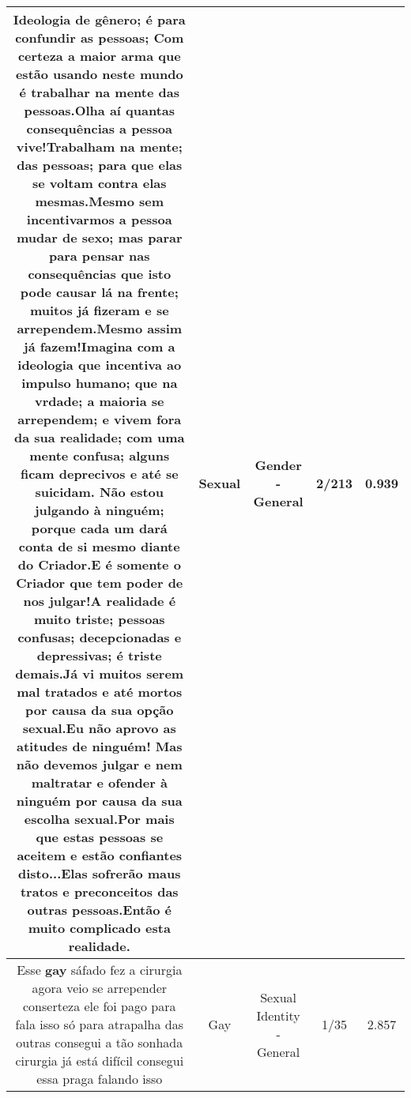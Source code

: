 \documentclass[11pt]{article}
\newlength\mylength
\begin{document}
\begin{center}
\begin{longtable}{|C{.65\mylength}|C{.30\mylength}|C{.12\mylength}|C{.12\mylength}|C{.12\mylength}|}
  \small Ideologia de gênero; é para confundir as pessoas; Com certeza a maior arma que estão usando neste mundo é trabalhar na mente das pessoas.Olha aí quantas consequências a pessoa vive!Trabalham na mente; das pessoas; para que elas se voltam contra elas mesmas.Mesmo sem incentivarmos a pessoa mudar de sexo; mas parar para pensar nas consequências que isto pode causar lá na frente; muitos já fizeram e se arrependem.Mesmo assim já fazem!Imagina com a ideologia que incentiva ao impulso humano; que na vrdade; a maioria se arrependem; e vivem fora da sua realidade; com uma mente confusa; alguns ficam deprecivos e até se suicidam. Não estou julgando à ninguém; porque cada um dará conta de si mesmo diante do Criador.E é somente o Criador que tem poder de nos julgar!A realidade é muito triste; pessoas confusas; decepcionadas e depressivas; é triste demais.Já vi muitos serem mal tratados e até mortos por causa da sua opção \textbf{sexual}.Eu não aprovo as atitudes de ninguém! Mas não devemos julgar e nem maltratar e ofender à ninguém por causa da sua escolha \textbf{sexual}.Por mais que estas pessoas se aceitem e estão confiantes disto...Elas sofrerão maus tratos e preconceitos das outras pessoas.Então é muito complicado esta realidade.\normalsize   & Sexual & Gender - General & 2/213 & 0.939 \\  \hline
  \small Esse \textbf{gay} sáfado fez a cirurgia agora veio se arrepender conserteza ele foi pago para fala isso só para atrapalha das outras consegui a tão sonhada cirurgia já está difícil consegui essa praga falando isso\normalsize   & Gay & Sexual Identity - General & 1/35 & 2.857 \\  \hline

\end{longtable}
\end{center}
\end{document}
